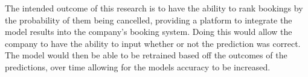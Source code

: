 \begin{itemize}
\end{itemize}
\vspace{5mm}

The intended outcome of this research is to have the ability to rank bookings by the probability of them being cancelled, providing a platform to integrate the model results into the company's booking system. Doing this would allow the company to have the ability to input whether or not the prediction was correct. The model would then be able to be retrained based off the outcomes of the predictions, over time allowing for the models accuracy to be increased. 